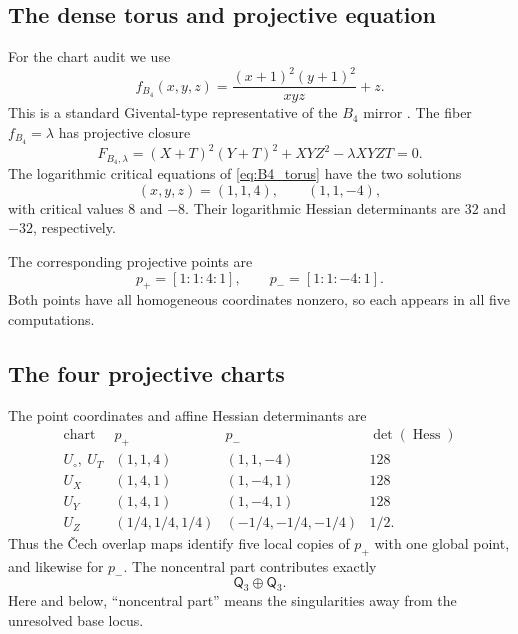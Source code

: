 \documentclass[11pt]{amsart}
\theoremstyle{definition}
\theoremstyle{remark}
\newcommand{\MorseCat}[1]{\mathsf{Q}_{#1}}
\begin{document}
\subsection{The dense torus and projective equation}

For the chart audit we use
\begin{equation}
\label{eq:B4_torus}
f_{B_4}(x,y,z)=\frac{(x+1)^2(y+1)^2}{xyz}+z.
\end{equation}
This is a standard Givental-type representative of the $B_4$ mirror
\cite{PrzyjalkowskiWeak,PrzyjalkowskiToric}.
The fiber $f_{B_4}=\lambda$ has projective closure
\begin{equation}
\label{eq:B4_pencil}
F_{B_4,\lambda}
=(X+T)^2(Y+T)^2+XYZ^2-\lambda XYZT=0.
\end{equation}
The logarithmic critical equations of \eqref{eq:B4_torus} have the two
solutions
\[
(x,y,z)=(1,1,4),\qquad (1,1,-4),
\]
with critical values $8$ and $-8$.  Their logarithmic Hessian determinants
are $32$ and $-32$, respectively.

The corresponding projective points are
\[
p_+=[1:1:4:1],\qquad p_-=[1:1:-4:1].
\]
Both points have all homogeneous coordinates nonzero, so each appears in all
five computations.

\subsection{The four projective charts}

The point coordinates and affine Hessian determinants are
\[
\begin{array}{c|c|c|c}
\text{chart}&p_+&p_-&\det(\operatorname{Hess})\\ \hline
U_\circ,\ U_T&(1,1,4)&(1,1,-4)&128\\
U_X&(1,4,1)&(1,-4,1)&128\\
U_Y&(1,4,1)&(1,-4,1)&128\\
U_Z&(1/4,1/4,1/4)&(-1/4,-1/4,-1/4)&1/2.
\end{array}
\]
Thus the Čech overlap maps identify five local copies of $p_+$ with one
global point, and likewise for $p_-$.  The noncentral part contributes exactly
\[
\MorseCat{3}\oplus\MorseCat{3}.
\]
Here and below, ``noncentral part'' means the singularities away from the
unresolved base locus.
\end{document}
